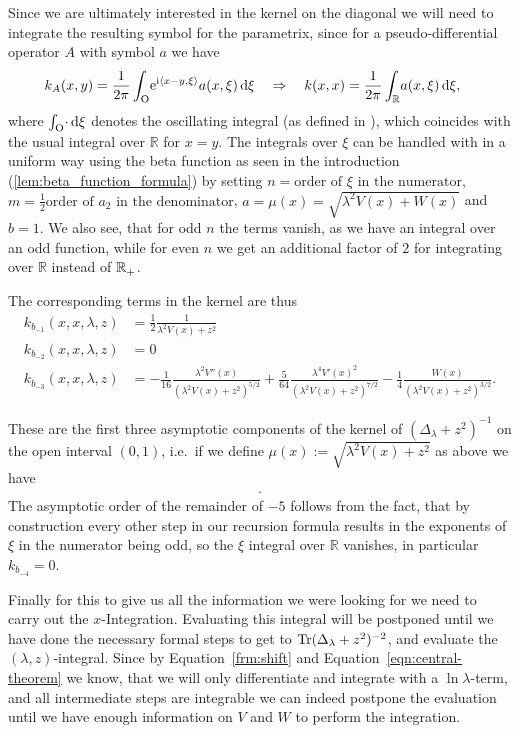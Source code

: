 Since we are ultimately interested in the kernel on the diagonal we will need to
integrate the resulting symbol for the parametrix, since for a
pseudo-differential operator $A$ with symbol $a$ we have
\begin{align*}
  k_A(x,y) &= \frac{1}{2\pi}\int_{\mathrm O}^{}\!
    \mathrm e^{\mathrm i\left\langle x-y, \xi\right\rangle} a(x,\xi)
  \,\mathrm d{\xi}
  \quad
  \Rightarrow
  \quad
  k(x,x) = \frac{1}{2\pi}\int_{\mathbb{R}}^{}\!a(x,\xi)\,\mathrm d{\xi},
\end{align*}
where $\int_{\mathrm O}^{}\!\cdot\,\mathrm d{\xi}$ denotes the oscillating integral (as defined in
\cite[]{Shu:POS}), which coincides with the usual integral over $\mathbb{R}$ for
$x = y$. The integrals over $\xi$ can be handled with in a uniform way using the
beta function as seen in the introduction (\ref{lem:beta_function_formula}) by
setting $n = \text{order of $\xi$ in the numerator}$, $m = \tfrac12\text{order
of $a_2$ in the denominator}$, $a=\mu(x)=\sqrt{\lambda^2 V(x) + W(x)}$ and $b =
1$. We also see, that for odd $n$ the terms vanish, as we have an integral over
an odd function, while for even $n$ we get an additional factor of $2$ for
integrating over $\mathbb{R}$ instead of ${\mathbb{R}_+^{}}$.

The corresponding terms in the kernel are thus
\begin{align}
  k_{b_{-1}}(x,x,\lambda,z) &= \frac{1}{2} \frac{1}{\lambda^2 V(x) + z^2} \\
  k_{b_{-2}}(x,x,\lambda,z) &= 0 \\
  k_{b_{-3}}(x,x,\lambda,z) &= - \frac{1}{16} \frac{\lambda^2 V''(x)}{(\lambda^2
    V(x) + z^2)^{5/2}} + \frac{5}{64} \frac{\lambda^4 V'(x)^2}{(\lambda^2V(x)
    + z^2)^{7/2}} -\frac{1}{4}\frac{W(x)}{(\lambda^2 V(x) + z^2)^{3/2}}.
  \label{eqn:coeff-kernel}
\end{align}

These are the first three asymptotic components of the kernel of
$(\Delta_\lambda + z^2)^{-1}$ on the open interval $(0,1)$, i.e.\ if we define
$\mu(x) := \sqrt{\lambda^2 V(x) + z^2}$ as above we have
\begin{align*}
  .
\end{align*}
The asymptotic order of the remainder of $-5$ follows from the fact, that by
construction every other step in our recursion formula results in the exponents
of $\xi$ in the numerator being odd, so the $\xi$ integral over $\mathbb{R}$
vanishes, in particular $k_{b_{-4}} = 0$.

Finally for this to give us all the information we were looking for we need to
carry out the $x$-Integration. Evaluating this integral will be postponed until
we have done the necessary formal steps to get to $\operatorname{Tr}(\Delta_\lambda +
z^2)^{-2}$, and evaluate the $(\lambda,z)$-integral. Since by
Equation~\eqref{frm:shift} and Equation~\eqref{eqn:central-theorem} we know,
that we will only differentiate and integrate with a $\ln\lambda$-term, and all
intermediate steps are integrable we can indeed postpone the evaluation until we
have enough information on $V$ and $W$ to perform the integration.

